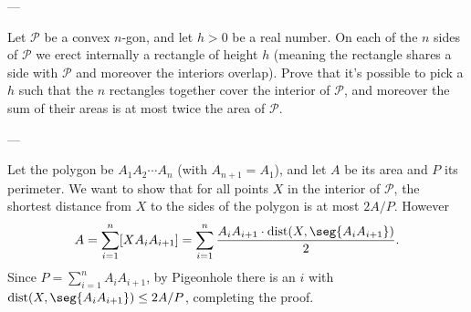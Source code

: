 
---

Let $\mathcal P$ be a convex $n$-gon, and let $h>0$ be a real number. On each of the $n$ sides of $\mathcal P$ we erect internally a rectangle of height $h$ (meaning the rectangle shares a side with $\mathcal P$ and moreover the interiors overlap). Prove that it's possible to pick a $h$ such that the $n$ rectangles together cover the interior of $\mathcal P$, and moreover the sum of their areas is at most twice the area of $\mathcal P$.

---

Let the polygon be $A_1A_2\cdots A_n$ (with $A_{n+1}=A_1$), and let $A$ be its area and $P$ its perimeter. We want to show that for all points $X$ in the interior of $\mathcal P$, the shortest distance from $X$ to the sides of the polygon is at most $2A/P$. However \[A=\sum_{i=1}^n[XA_iA_{i+1}]=\sum_{i=1}^n\frac{A_iA_{i+1}\cdot\operatorname{dist}(X,\seg{A_iA_{i+1}})}2.\]
Since $P=\sum_{i=1}^nA_iA_{i+1}$, by Pigeonhole there is an $i$ with $\operatorname{dist}(X,\seg{A_iA_{i+1}})\le 2A/P$, completing the proof.


